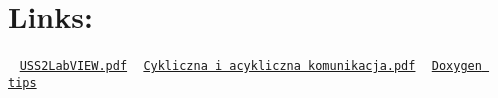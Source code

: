 \hypertarget{referenced_documents_links_sec}{}\section{Links\+:}\label{referenced_documents_links_sec}
~\newline
 \href{../../literature/USS2LabVIEW.pdf}{\tt U\+S\+S2\+Lab\+V\+I\+E\+W.\+pdf} ~\newline
 \href{../../literature/Cykliczna i acykliczna komunikacja.pdf}{\tt Cykliczna i acykliczna komunikacja.\+pdf} ~\newline
 \href{https://www.rosettacommons.org/manuals/rosetta3.2_user_guide/doxygen_tips.html}{\tt Doxygen tips} 